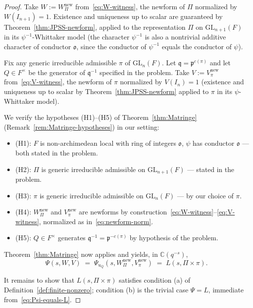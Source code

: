 \documentclass[12pt]{article}
\theoremstyle{definition}
\begin{document}
\begin{proof}
Take $W:=W_\Pi^{\mathrm{new}}$ from~\eqref{eq:W-witness}, the newform of $\Pi$ normalized by $W(I_{n+1})=1$. Existence and uniqueness up to scalar are guaranteed by Theorem~\ref{thm:JPSS-newform}, applied to the representation $\Pi$ on $\mathrm{GL}_{n+1}(F)$ in its $\psi^{-1}$-Whittaker model (the character $\psi^{-1}$ is also a nontrivial additive character of conductor $\mathfrak{o}$, since the conductor of $\psi^{-1}$ equals the conductor of $\psi$).

Fix any generic irreducible admissible $\pi$ of $\mathrm{GL}_n(F)$. Let $\mathfrak{q}=\mathfrak{p}^{c(\pi)}$ and let $Q\in F^\times$ be the generator of $\mathfrak{q}^{-1}$ specified in the problem. Take $V:=V_\pi^{\mathrm{new}}$ from~\eqref{eq:V-witness}, the newform of $\pi$ normalized by $V(I_n)=1$ (existence and uniqueness up to scalar by Theorem~\ref{thm:JPSS-newform} applied to $\pi$ in its $\psi$-Whittaker model).

We verify the hypotheses (H1)--(H5) of Theorem~\ref{thm:Matringe} (Remark~\ref{rem:Matringe-hypotheses}) in our setting:
\begin{itemize}
\item (H1): $F$ is non-archimedean local with ring of integers $\mathfrak{o}$, $\psi$ has conductor $\mathfrak{o}$ — both stated in the problem.
\item (H2): $\Pi$ is generic irreducible admissible on $\mathrm{GL}_{n+1}(F)$ — stated in the problem.
\item (H3): $\pi$ is generic irreducible admissible on $\mathrm{GL}_n(F)$ — by our choice of $\pi$.
\item (H4): $W_\Pi^{\mathrm{new}}$ and $V_\pi^{\mathrm{new}}$ are newforms by construction~\eqref{eq:W-witness}--\eqref{eq:V-witness}, normalized as in~\eqref{eq:newform-norm}.
\item (H5): $Q\in F^\times$ generates $\mathfrak{q}^{-1}=\mathfrak{p}^{-c(\pi)}$ by hypothesis of the problem.
\end{itemize}

Theorem~\ref{thm:Matringe} now applies and yields, in $\mathbb{C}(q^{-s})$,
\begin{equation}\label{eq:Psi-equals-L}
\Psi(s,W,V)\;=\;\Psi_{u_Q}(s,W_\Pi^{\mathrm{new}},V_\pi^{\mathrm{new}})\;=\;L(s,\Pi\times\pi).
\end{equation}

It remains to show that $L(s,\Pi\times\pi)$ satisfies condition (a) of Definition~\ref{def:finite-nonzero}; condition (b) is the trivial case $\Psi=L$, immediate from~\eqref{eq:Psi-equals-L}.


\end{proof}
\end{document}
